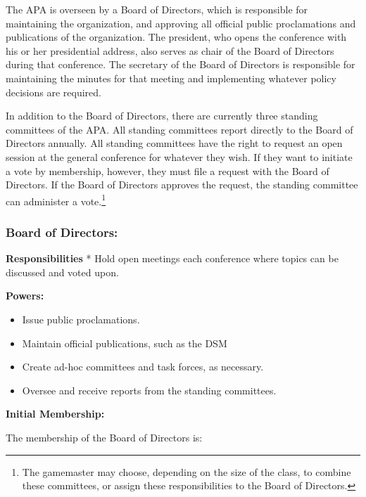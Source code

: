 \begin{refsection}
The APA is overseen by a Board of Directors, which is responsible for maintaining the organization, and approving all official public proclamations and publications of the organization. The president, who opens the conference with his or her presidential address, also serves as chair of the Board of Directors during that conference. The secretary of the Board of Directors is responsible for maintaining the minutes for that meeting and implementing whatever policy decisions are required.

In addition to the Board of Directors, there are currently three standing committees of the APA. All standing committees report directly to the Board of Directors annually. All standing committees have the right to request an open session at the general conference for whatever they wish. If they want to initiate a vote by membership, however, they must file a request with the Board of Directors. If the Board of Directors approves the request, the standing committee can administer a vote.\footnote{The gamemaster may choose, depending on the size of the class, to combine these committees, or assign these responsibilities to the Board of Directors.}

\subsubsection{Board of Directors:}
\label{boardofdirectors:}

\textbf{Responsibilities}
* Hold open meetings each conference where topics can be discussed and voted upon.

\textbf{Powers:}

\begin{itemize}
\item Issue public proclamations.

\item Maintain official publications, such as the DSM

\item Create ad-hoc committees and task forces, as necessary.

\item Oversee and receive reports from the standing committees.

\end{itemize}

\textbf{Initial Membership:}

The membership of the Board of Directors is:


\end{refsection}
